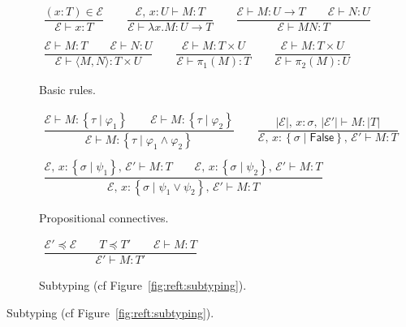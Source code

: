 \documentclass[%
  a4paper,
  UKenglish,
  cleveref,
  autoref,
  thm-restate,
  numberwithinsect,
]{lipics-v2021}
\newcommand\thesis{\vdash}
\newcommand\pair[1]{{\langle #1\rangle}}
\newcommand\temp[1]{\mathsf{#1}}
\newcommand\False{\temp{False}}
\newcommand\Env{\mathcal{E}}    %
\newcommand\arrow\to
\newcommand\subtype\preceq
\newcommand\reft[1]{\left\{ #1 \right\}}
\newcommand\PT{\tau}		%
\newcommand\PTbis{\sigma}	%
\newcommand\RT{T}               %
\newcommand\RTbis{U}            %
\newcommand\UPT[1]{\vert #1 \vert}        %
\begin{document}
\begin{figure}[t!]
\begin{subfigure}{\textwidth}
\centering
\(
\begin{array}{c}
%
\dfrac{(x \colon \RT) \in \Env}
  {\Env \thesis x \colon \RT}
%
\qquad
%
\dfrac{\Env,\, x \colon \RTbis \thesis M \colon \RT}
  {\Env \thesis \lambda x.M \colon \RTbis \arrow \RT}
%
\qquad
%
\dfrac{\Env \thesis M \colon \RTbis \arrow \RT
  \qquad
  \Env \thesis N \colon \RTbis}
  {\Env \thesis M N \colon \RT}
%
\\\\
%
\dfrac{\Env \thesis M \colon \RT
  \qquad
  \Env \thesis N \colon \RTbis}
  {\Env \thesis \pair{M,N} \colon \RT \times \RTbis}
%
\qquad
%
\dfrac{\Env \thesis M \colon \RT \times \RTbis}
  {\Env \thesis \pi_1(M) \colon \RT}
%
\qquad
%
\dfrac{\Env \thesis M \colon \RT \times \RTbis}
  {\Env \thesis \pi_2(M) \colon \RTbis}
%
\end{array}
\)
\caption{Basic rules.%
\label{fig:reft:basic}}
\end{subfigure}

\begin{subfigure}{\textwidth}
\centering
\(
\begin{array}{c}
%
\dfrac{
  \Env \thesis M \colon \reft{\PT \mid \varphi_1}
  \qquad
  \Env \thesis M \colon \reft{\PT \mid \varphi_2}}
  {\Env \thesis M \colon \reft{\PT \mid \varphi_1 \land \varphi_2}}
%
\qquad
%
\dfrac{\UPT\Env,\, x\colon \PTbis,\, \UPT{\Env'} \thesis M \colon \UPT\RT}
  {\Env,\, x \colon \reft{\PTbis \mid \False},\, \Env' \thesis M \colon \RT}
%
\\\\
%
\dfrac{\Env,\, x\colon \reft{\PTbis \mid \psi_1},\, \Env' \thesis M \colon \RT
  \qquad
  \Env,\, x\colon \reft{\PTbis \mid \psi_2},\, \Env' \thesis M \colon \RT}
  {\Env,\, x \colon \reft{\PTbis \mid \psi_1 \lor \psi_2},\, \Env' \thesis M \colon \RT}
%
\end{array}
\)
\caption{Propositional connectives.%
\label{fig:reft:log}}
\end{subfigure}

\begin{subfigure}{\textwidth}
\centering
\(
\begin{array}{c}
%
\dfrac{
  \Env' \subtype \Env
  \qquad 
  \RT \subtype \RT'
  \qquad
  \Env \thesis M \colon \RT}
  {\Env' \thesis M \colon \RT'}
%
\end{array}
\)
\caption{Subtyping (cf Figure~\ref{fig:reft:subtyping}).%
\label{fig:reft:reftsub}}
\end{subfigure}



\end{figure}
\end{document}
